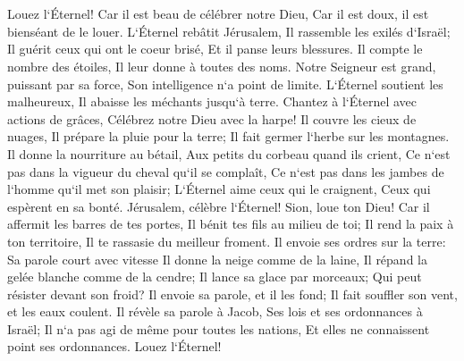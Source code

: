 \chapter{}

\verse Louez l`Éternel! Car il est beau de célébrer notre Dieu, Car il est doux, il est bienséant de le louer. 
\verse L`Éternel rebâtit Jérusalem, Il rassemble les exilés d`Israël; 
\verse Il guérit ceux qui ont le coeur brisé, Et il panse leurs blessures. 
\verse Il compte le nombre des étoiles, Il leur donne à toutes des noms. 
\verse Notre Seigneur est grand, puissant par sa force, Son intelligence n`a point de limite. 
\verse L`Éternel soutient les malheureux, Il abaisse les méchants jusqu`à terre. 
\verse Chantez à l`Éternel avec actions de grâces, Célébrez notre Dieu avec la harpe! 
\verse Il couvre les cieux de nuages, Il prépare la pluie pour la terre; Il fait germer l`herbe sur les montagnes. 
\verse Il donne la nourriture au bétail, Aux petits du corbeau quand ils crient, 
\verse Ce n`est pas dans la vigueur du cheval qu`il se complaît, Ce n`est pas dans les jambes de l`homme qu`il met son plaisir; 
\verse L`Éternel aime ceux qui le craignent, Ceux qui espèrent en sa bonté. 
\verse Jérusalem, célèbre l`Éternel! Sion, loue ton Dieu! 
\verse Car il affermit les barres de tes portes, Il bénit tes fils au milieu de toi; 
\verse Il rend la paix à ton territoire, Il te rassasie du meilleur froment. 
\verse Il envoie ses ordres sur la terre: Sa parole court avec vitesse 
\verse Il donne la neige comme de la laine, Il répand la gelée blanche comme de la cendre; 
\verse Il lance sa glace par morceaux; Qui peut résister devant son froid? 
\verse Il envoie sa parole, et il les fond; Il fait souffler son vent, et les eaux coulent. 
\verse Il révèle sa parole à Jacob, Ses lois et ses ordonnances à Israël; 
\verse Il n`a pas agi de même pour toutes les nations, Et elles ne connaissent point ses ordonnances. Louez l`Éternel! 

\chapter{}

